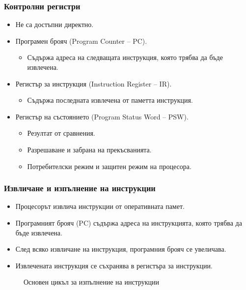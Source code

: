 \documentclass[ignorenonframetext, hyperref=unicode]{beamer}
\begin{document}
\begin{frame}
\frametitle{Контролни регистри}
\begin{itemize}
\item Не са достъпни директно.
\item Програмен брояч (Program Counter -- PC).
\begin{itemize}
  \item Съдържа адреса на следващата инструкция, която трябва да бъде извлечена.
\end{itemize}
\item Регистър за инструкция (Instruction Register -- IR).
\begin{itemize}
  \item Съдържа последната извлечена от паметта инструкция.
\end{itemize}
\item Регистър на състоянието (Program Status Word -- PSW).
\begin{itemize}
  \item Резултат от сравнения.
  \item Разрешаване и забрана на прекъсванията.
  \item Потребителски режим и защитен режим на процесора.
\end{itemize}
\end{itemize}
\end{frame}

\begin{frame}
\frametitle{Извличане и изпълнение на инструкции}
\begin{itemize}
\item Процесорът извлича инструкции от оперативната памет.
\item Програмният брояч (PC) съдържа адреса на инструкцията, която трябва да
бъде извлечена.
\item След всяко извличане на инструкция, програмния брояч се увеличава.
\item Извлечената инструкция се съхранява в регистъра за инструкции.
\end{itemize}
\begin{figure}[h]
\center
{}
\caption{Основен цикъл за изпълнение на инструкции}
\end{figure}
\end{frame}
\end{document}
